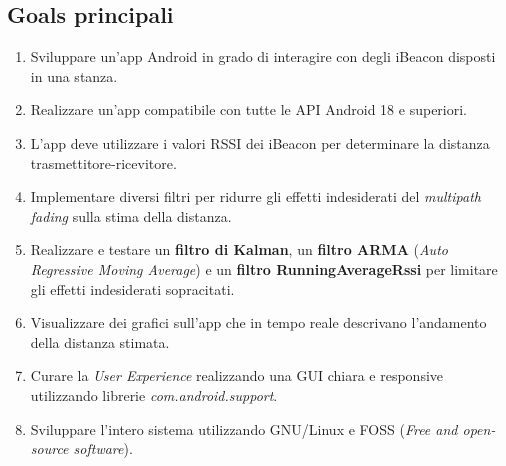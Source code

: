 \subsection{Goals principali}
\begin{enumerate}
	\item Sviluppare un'app Android in grado di interagire con degli iBeacon disposti in una stanza.
	
	\item Realizzare un'app compatibile con tutte le API Android 18 e superiori.
	
	\item L'app deve utilizzare i valori RSSI dei iBeacon per determinare la distanza trasmettitore-ricevitore.
	
	\item Implementare diversi filtri per ridurre gli effetti indesiderati del \textit{multipath fading} sulla stima della distanza.
	
	\item Realizzare e testare un \textbf{filtro di Kalman}, un \textbf{filtro ARMA} (\textit{Auto Regressive Moving Average}) e un \textbf{filtro RunningAverageRssi} per limitare gli effetti indesiderati sopracitati.
	
	\item Visualizzare dei grafici sull'app che in tempo reale descrivano l'andamento della distanza stimata.
	
	\item Curare la \textit{User Experience} realizzando una GUI chiara e responsive utilizzando librerie \textit{com.android.support}.
	
	\item Sviluppare l'intero sistema utilizzando GNU/Linux e FOSS (\textit{Free and open-source software}).
\end{enumerate}

